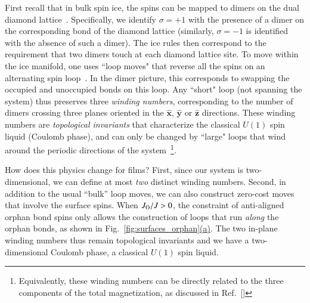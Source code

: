 \documentclass[aps,prx,reprint,runinaddress,superscriptaddress,amsmath,amssymb,floatfix,longbibliography]{revtex4-1}
\renewcommand{\vec}[1]{\boldsymbol{#1}}
\newcommand{\vhat}[1]{\vec{\hat{#1}}}
\newcommand{\Jo}{J_{\rm O}}
\newcommand{\subref}[2]{\ref{#1}\hyperref[#1]{#2}}
\begin{document}
First recall that in bulk spin ice, the spins can be mapped to dimers on the dual diamond lattice~\cite{Hermele2003}. Specifically, we identify $\sigma = +1$  with the presence of a dimer on the corresponding bond of the diamond lattice (similarly, $\sigma = -1$ is identified with the absence of such a dimer). The ice rules then correspond to the requirement that two dimers touch at each diamond lattice site. To move within the ice manifold, one uses ``loop moves" that reverse all the spins on an alternating spin loop~\cite{Melko2001, melko2004monte}. In the dimer picture, this corresponds to swapping the occupied and unoccupied bonds on this loop. Any ``short" loop (not spanning the system) thus preserves three \emph{winding numbers}, corresponding to the number of dimers crossing three planes oriented in the $\vhat{x}$, $\vhat{y}$ or $\vhat{z}$ directions. These winding numbers are \emph{topological invariants} that characterize the classical $U(1)$ spin liquid (Coulomb phase), and can only be changed by ``large" loops that wind around the periodic directions of the system~\footnote{Equivalently, these winding numbers can be directly related to the three components of the total magnetization, as discussed in Ref.~[]}.

How does this physics change for films? First, since our system is two-dimensional, we can define at most \emph{two} distinct winding numbers. Second, in addition to the usual ``bulk'' loop moves, we can also construct zero-cost moves that involve the surface spins. When $\Jo/J > 0$, the constraint of anti-aligned orphan bond spins only allows the construction of loops that run \textit{along} the orphan bonds, as shown in Fig.~\subref{fig:surfaces_orphan}{(a)}. The two in-plane winding numbers thus remain topological invariants and we have a two-dimensional Coulomb phase, a classical $U(1)$ spin liquid.
\end{document}
